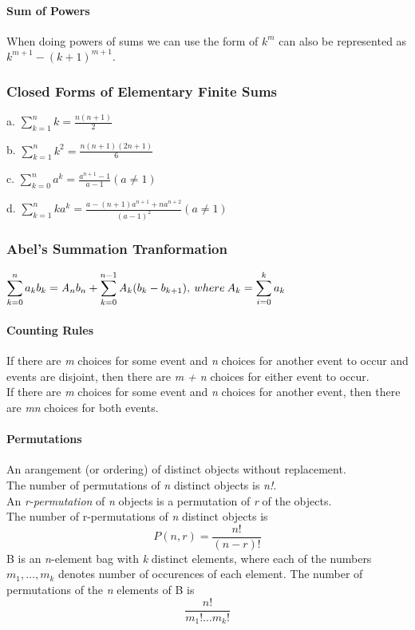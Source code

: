 \documentclass[10pt,twocolumn]{article}
\newenvironment{packed_list}{
\begin{itemize}
  \setlength{\itemsep}{1pt}
  \setlength{\parskip}{0pt}
  \setlength{\parsep}{0pt}
}{\end{itemize}}
\begin{document}
	\paragraph*{Sum of Powers}
	When doing powers of sums we can use the form of $k^m$ can also be
	represented as $k^{m+1} - ( k + 1)^{m+1}.$

	\subsubsection*{Closed Forms of Elementary Finite Sums}
	\begin{packed_list}
        \item[a.] $\displaystyle\sum_{k=1}^n k = \frac{n(n+1)}{2}$
	\item[b.] $\displaystyle\sum_{k=1}^n k^2 = \frac{n(n+1)(2n+1)}{6}$
	\item[c.] $\displaystyle\sum_{k=0}^n a^k = \frac{a^{n+1} - 1}{a -1} ( a \neq
	1)$
	\item[d.] $\displaystyle\sum_{k=1}^n ka^k = \frac{a - (n + 1)a^{n+1} +
	  na^{n+2}}{(a-1)^2} (a \neq 1)$
        \end{packed_list}

	\subsubsection*{Abel's Summation Tranformation}
	$\displaystyle\sum_{k=0}^n a_kb_k = \mathit{A}_nb_n + \sum_{k=0}^{n-1}
	\mathit{A}_k(b_k - b_{k+1}),\\
	  \:where\:A_k = \sum_{i=0}^k a_k$
	

	\paragraph*{Counting Rules}
	If there are \textit{m} choices for some event and \textit{n}
        choices for another event to occur and events are disjoint,
        then there are \textit{m + n} choices for either event to occur. \\
	If there are \textit{m} choices for some event and \textit{n}
        choices for another event, then there are \textit{mn} choices
        for both events.

	\paragraph*{Permutations}
	An arangement (or ordering) of distinct objects without replacement. \\
	The number of permutations of \textit{n} distinct objects is \textit{n!}. \\
	An \textit{r-permutation} of \textit{n} objects is a
        permutation of \textit{r} of the objects. \\
	The number of r-permutations of \textit{n} distinct objects is
	\[P(n, r)=\frac{n!}{(n - r)!}\]
	B is an \textit{n}-element bag with \textit{k} distinct
        elements, where each of the numbers $m_1,\ldots,m_k$ denotes
        number of occurences of each element.  The number of
        permutations of the \textit{n} elements of B is \[\frac{n!}{m_1! \ldots m_k!}\]
\end{document}
